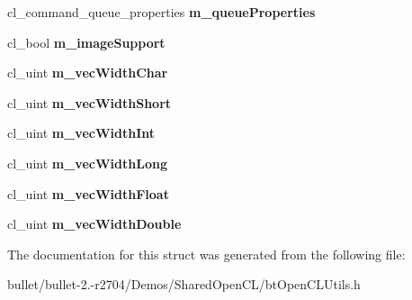 \begin{DoxyCompactItemize}
\item 
\hypertarget{structbt_open_c_l_device_info_a75f79343360f7434a6432fa241be7277}{cl\+\_\+command\+\_\+queue\+\_\+properties {\bfseries m\+\_\+queue\+Properties}}\label{structbt_open_c_l_device_info_a75f79343360f7434a6432fa241be7277}

\item 
\hypertarget{structbt_open_c_l_device_info_a61a1c3603482956c69befb08e639e3d0}{cl\+\_\+bool {\bfseries m\+\_\+image\+Support}}\label{structbt_open_c_l_device_info_a61a1c3603482956c69befb08e639e3d0}

\item 
\hypertarget{structbt_open_c_l_device_info_a35be3e74b746798c7478590a3da4f126}{cl\+\_\+uint {\bfseries m\+\_\+vec\+Width\+Char}}\label{structbt_open_c_l_device_info_a35be3e74b746798c7478590a3da4f126}

\item 
\hypertarget{structbt_open_c_l_device_info_aa35474955d1f68f130b64bcb8b7ac53d}{cl\+\_\+uint {\bfseries m\+\_\+vec\+Width\+Short}}\label{structbt_open_c_l_device_info_aa35474955d1f68f130b64bcb8b7ac53d}

\item 
\hypertarget{structbt_open_c_l_device_info_ae3691603e8f03d86c7dbaf44602724ae}{cl\+\_\+uint {\bfseries m\+\_\+vec\+Width\+Int}}\label{structbt_open_c_l_device_info_ae3691603e8f03d86c7dbaf44602724ae}

\item 
\hypertarget{structbt_open_c_l_device_info_ace43be7a5c7d6d302235d2c7d1be5670}{cl\+\_\+uint {\bfseries m\+\_\+vec\+Width\+Long}}\label{structbt_open_c_l_device_info_ace43be7a5c7d6d302235d2c7d1be5670}

\item 
\hypertarget{structbt_open_c_l_device_info_ae6ac5d608d01b5b6fc2d80df0e729fc1}{cl\+\_\+uint {\bfseries m\+\_\+vec\+Width\+Float}}\label{structbt_open_c_l_device_info_ae6ac5d608d01b5b6fc2d80df0e729fc1}

\item 
\hypertarget{structbt_open_c_l_device_info_a12664c30803b5e8d4b4aafd92a20bd5f}{cl\+\_\+uint {\bfseries m\+\_\+vec\+Width\+Double}}\label{structbt_open_c_l_device_info_a12664c30803b5e8d4b4aafd92a20bd5f}

\end{DoxyCompactItemize}


The documentation for this struct was generated from the following file\+:\begin{DoxyCompactItemize}
\item 
bullet/bullet-\/2.-\/r2704/\+Demos/\+Shared\+Open\+C\+L/bt\+Open\+C\+L\+Utils.\+h\end{DoxyCompactItemize}
